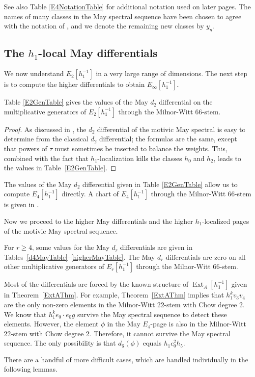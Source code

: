 \documentclass[10pt]{amsart}
\begin{document}
See also Table \ref{E4NotationTable} for additional notation used
on later pages. The names of many classes in the May spectral sequence have been chosen to agree with the notation of \cite{Istems}, and we denote the remaining new classes by $y_n$.

\subsection{The $h_1$-local May differentials}
\label{subsctn:May-diff}

We now understand $E_2[h_1^{-1}]$ in a very large range of dimensions.
The next step is to compute the higher differentials to obtain 
$E_\infty[h_1^{-1}]$.

\begin{prop}
\label{prop:May-d2}
Table \ref{E2GenTable} gives the values of the May $d_2$ differential on 
the multiplicative generators of $E_2[h_1^{-1}]$ through the Milnor-Witt 66-stem.
\end{prop}

\begin{proof}
As discussed in \cite[\S5]{DI}, the $d_2$ differential of the motivic May spectral is easy to determine from the classical $d_2$ differential; 
the formulas are the same, except that powers of $\tau$ must sometimes be inserted to balance the weights. This, combined with the fact that $h_1$-localization kills the classes $h_0$ and $h_2$, leads to the values in Table~\ref{E2GenTable}.
\end{proof}

The values of the May $d_2$ differential given in Table \ref{E2GenTable}
allow us to compute $E_4[h_1^{-1}]$ directly.
A chart of $E_4[h_1^{-1}]$ through the Milnor-Witt 66-stem is given in
\cite{GI}.  

Now we proceed to the higher May differentials and the higher
$h_1$-localized pages of the motivic May spectral sequence.

\begin{prop} 
For $r \geq 4$,
some values for the May $d_r$ differentials are given in 
Tables~\ref{d4MayTable}--\ref{higherMayTable}.
The May $d_r$ differentials are zero on all other multiplicative generators
of $E_r[h_1^{-1}]$ through the Milnor-Witt 66-stem.
\end{prop}

\begin{pf}
Most of the differentials are forced by the known structure
of $\operatorname{Ext}_A[h_1^{-1}]$ given in Theorem~\ref{ExtAThm}.
For example, Theorem~\ref{ExtAThm} implies that 
$h_1^k v_3 v_4$ are the only non-zero elements in the Milnor-Witt 22-stem
with Chow degree 2.  We know that $h_1^k e_0 \cdot e_0 g$ survive the
May spectral sequence to detect these elements.
However, the element $\phi$ in the May $E_4$-page is also in the
Milnor-Witt 22-stem with Chow degree 2.  Therefore, it cannot survive the
May spectral sequence.  The only possibility is that
$d_6(\phi)$ equals $h_1 c_0^2 h_5$.

There are a handful of  more difficult cases, which are handled individually
in the following lemmas.
\end{pf}
\end{document}
